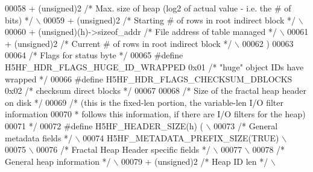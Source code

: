 \begin{DoxyCode}
00058 \textcolor{preprocessor}{    + (unsigned)2 }\textcolor{comment}{/* Max. size of heap (log2 of actual value - i.e. the # of bits) */}\textcolor{preprocessor}{   \(\backslash\)}
00059 \textcolor{preprocessor}{    + (unsigned)2 }\textcolor{comment}{/* Starting # of rows in root indirect block */}\textcolor{preprocessor}{             \(\backslash\)}
00060 \textcolor{preprocessor}{    + (unsigned)(h)->sizeof\_addr }\textcolor{comment}{/* File address of table managed */}\textcolor{preprocessor}{          \(\backslash\)}
00061 \textcolor{preprocessor}{    + (unsigned)2 }\textcolor{comment}{/* Current # of rows in root indirect block */}\textcolor{preprocessor}{              \(\backslash\)}
00062 \textcolor{preprocessor}{    )}
00063 
00064 \textcolor{comment}{/* Flags for status byte */}
00065 \textcolor{preprocessor}{#define H5HF\_HDR\_FLAGS\_HUGE\_ID\_WRAPPED 0x01     }\textcolor{comment}{/* "huge" object IDs have wrapped */}\textcolor{preprocessor}{}
00066 \textcolor{preprocessor}{#define H5HF\_HDR\_FLAGS\_CHECKSUM\_DBLOCKS 0x02    }\textcolor{comment}{/* checksum direct blocks */}\textcolor{preprocessor}{}
00067 
00068 \textcolor{comment}{/* Size of the fractal heap header on disk */}
00069 \textcolor{comment}{/* (this is the fixed-len portion, the variable-len I/O filter information}
00070 \textcolor{comment}{ *      follows this information, if there are I/O filters for the heap)}
00071 \textcolor{comment}{ */}
00072 \textcolor{preprocessor}{#define H5HF\_HEADER\_SIZE(h)     (                                             \(\backslash\)}
00073 \textcolor{preprocessor}{    }\textcolor{comment}{/* General metadata fields */}\textcolor{preprocessor}{                                             \(\backslash\)}
00074 \textcolor{preprocessor}{    H5HF\_METADATA\_PREFIX\_SIZE(TRUE)                                           \(\backslash\)}
00075 \textcolor{preprocessor}{                                                                              \(\backslash\)}
00076 \textcolor{preprocessor}{    }\textcolor{comment}{/* Fractal Heap Header specific fields */}\textcolor{preprocessor}{                                 \(\backslash\)}
00077 \textcolor{preprocessor}{                                                                              \(\backslash\)}
00078 \textcolor{preprocessor}{    }\textcolor{comment}{/* General heap information */}\textcolor{preprocessor}{                                            \(\backslash\)}
00079 \textcolor{preprocessor}{    + (unsigned)2 }\textcolor{comment}{/* Heap ID len */}\textcolor{preprocessor}{                                           \(\backslash\)}

\end{DoxyCode}

